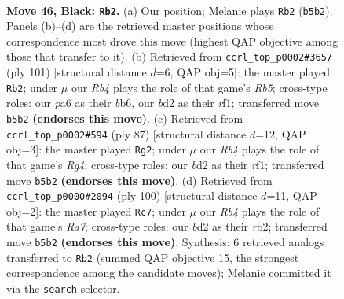 \documentclass[11pt]{article}
\begin{document}
\clearpage

\begin{figure}[p]\centering
\begin{subfigure}{0.46\textwidth}\centering
\resizebox{\linewidth}{!}{%
\newchessgame
\chessboard[
  setfen={8/p7/Pp4k1/1r6/8/6K1/3B4/8 b - - 1 46},
  showmover=false,
  pgfstyle=straightmove, color=movearrow, markmove={b5-b2}
]}
\caption{}
\end{subfigure}\hfill
\begin{subfigure}{0.46\textwidth}\centering
\resizebox{\linewidth}{!}{%
\newchessgame
\chessboard[
  setfen={8/8/pB4k1/1p6/1r6/3p2K1/8/5R2 b - - 1 51},
  showmover=false,
  pgfstyle=straightmove, color=movearrow, markmove={b4-b2}
]}
\caption{}
\end{subfigure}
\\[4pt]
\begin{subfigure}{0.46\textwidth}\centering
\resizebox{\linewidth}{!}{%
\newchessgame
\chessboard[
  setfen={8/6k1/2K1p1p1/6r1/2P5/8/8/5R2 b - - 0 44},
  showmover=false,
  pgfstyle=straightmove, color=movearrow, markmove={g5-g2}
]}
\caption{}
\end{subfigure}\hfill
\begin{subfigure}{0.46\textwidth}\centering
\resizebox{\linewidth}{!}{%
\newchessgame
\chessboard[
  setfen={6k1/R7/7p/5P2/6P1/6K1/1r6/8 w - - 5 51},
  showmover=false,
  pgfstyle=straightmove, color=movearrow, markmove={a7-c7}
]}
\caption{}
\end{subfigure}
\caption{\textbf{Move 46, Black: \texttt{Rb2}.} (a) Our position; Melanie plays \texttt{Rb2} (\texttt{b5b2}). Panels (b)--(d) are the retrieved master positions whose correspondence most drove this move (highest QAP objective among those that transfer to it). (b) Retrieved from \texttt{ccrl\_top\_p0002\#3657} (ply 101) [structural distance $d$=6, QAP obj=5]: the master played \texttt{Rb2}; under $\mu$ our \emph{Rb4} plays the role of that game's \emph{Rb5}; cross-type roles: our \emph{p}a6 as their \emph{b}b6, our \emph{b}d2 as their \emph{r}f1; transferred move \texttt{b5b2} \textbf{(endorses this move)}. (c) Retrieved from \texttt{ccrl\_top\_p0002\#594} (ply 87) [structural distance $d$=12, QAP obj=3]: the master played \texttt{Rg2}; under $\mu$ our \emph{Rb4} plays the role of that game's \emph{Rg4}; cross-type roles: our \emph{b}d2 as their \emph{r}f1; transferred move \texttt{b5b2} \textbf{(endorses this move)}. (d) Retrieved from \texttt{ccrl\_top\_p0000\#2094} (ply 100) [structural distance $d$=11, QAP obj=2]: the master played \texttt{Rc7}; under $\mu$ our \emph{Rb4} plays the role of that game's \emph{Ra7}; cross-type roles: our \emph{b}d2 as their \emph{r}b2; transferred move \texttt{b5b2} \textbf{(endorses this move)}. Synthesis: 6 retrieved analogs transferred to \texttt{Rb2} (summed QAP objective 15, the strongest correspondence among the candidate moves); Melanie committed it via the \texttt{search} selector.}
\label{fig:thought-m91}
\end{figure}
\end{document}
